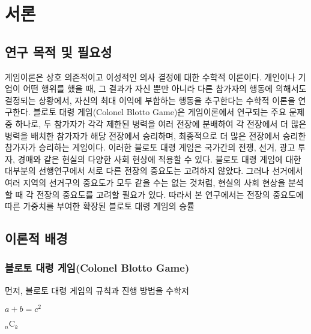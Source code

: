 \section{서론}
\subsection{연구 목적 및 필요성}
게임이론은 상호 의존적이고 이성적인 의사 결정에 대한 수학적 이론이다. 개인이나 기업이 어떤 행위를 했을 때, 그 결과가 자신 뿐만 아니라 다른 참가자의 행동에 의해서도 결정되는 상황에서, 자신의 최대 이익에 부합하는 행동을 추구한다는 수학적 이론을 연구한다.
블로토 대령 게임(Colonel Blotto Game)은 게임이론에서 연구되는 주요 문제 중 하나로, 두 참가자가 각각 제한된 병력을 여러 전장에 분배하여 각 전장에서 더 많은 병력을 배치한 참가자가 해당 전장에서 승리하며, 최종적으로 더 많은 전장에서 승리한 참가자가 승리하는 게임이다. 이러한 블로토 대령 게임은 국가간의 전쟁, 선거, 광고 투자, 경매와 같은 현실의 다양한 사회 현상에 적용할 수 있다.
블로토 대령 게임에 대한 대부분의 선행연구에서 서로 다른 전장의 중요도는 고려하지 않았다. 그러나 선거에서 여러 지역의 선거구의 중요도가 모두 같을 수는 없는 것처럼, 현실의 사회 현상을 분석할 때 각 전장의 중요도를 고려할 필요가 있다.
따라서 본 연구에서는 전장의 중요도에 따른 가중치를 부여한 확장된 블로토 대령 게임의 승률
\subsection{이론적 배경}
\subsubsection{블로토 대령 게임(Colonel Blotto Game)}
먼저, 블로토 대령 게임의 규칙과 진행 방법을 수학저


$a + b = c^2$

$_{n}\mathrm{C}_{k}$